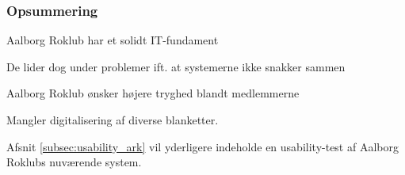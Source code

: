 \subsubsection*{Opsummering}
\label{subsec:itSystem_opsummering}

\begin{itemize_small}
    \item Aalborg Roklub har et solidt IT-fundament
    \item De lider dog under problemer ift. at systemerne ikke snakker sammen
    \item Aalborg Roklub ønsker højere tryghed blandt medlemmerne
    \item Mangler digitalisering af diverse blanketter.
\end{itemize_small}


Afsnit \ref{subsec:usability_ark} vil yderligere indeholde en usability-test af Aalborg Roklubs nuværende system.
